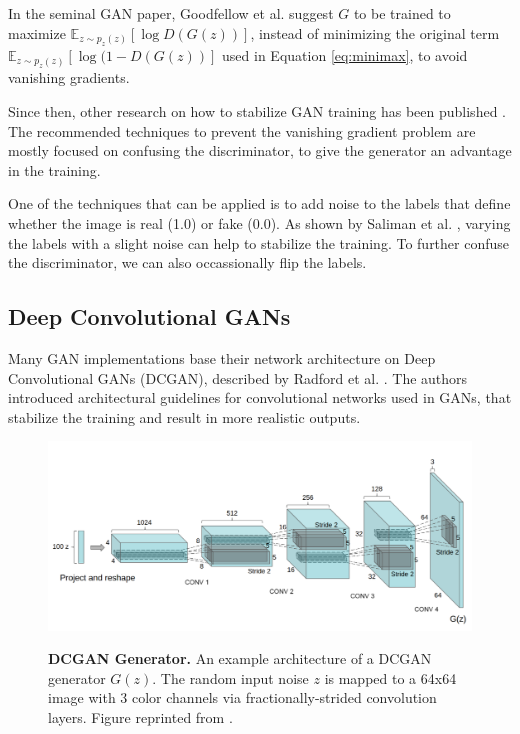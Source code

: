 \documentclass[12pt]{report}
\begin{document}
In the seminal GAN paper, Goodfellow et al. \cite{goodfellow_generative_2014} suggest $G$ to be trained to maximize $\mathbb{E}_{z \sim p_{z}(z)}[\log D(G(z))]$, instead of minimizing the original term $\mathbb{E}_{z \sim p_{z}(z)}[\log (1 - D(G(z))]$ used in Equation \ref{eq:minimax}, to avoid vanishing gradients. 

Since then, other research on how to stabilize GAN training has been published \cite{arjovsky_towards_2017}\cite{roth_stabilizing_2017}\cite{salimans_improved_2016}. The recommended techniques to prevent the vanishing gradient problem are mostly focused on confusing the discriminator, to give the generator an advantage in the training. 

One of the techniques that can be applied is to add noise to the labels that define whether the image is real (1.0) or fake (0.0). As shown by Saliman et al. \cite{salimans_improved_2016}, varying the labels with a slight noise can help to stabilize the training. To further confuse the discriminator, we can also occassionally flip the labels. 

\subsection{Deep Convolutional GANs} \label{sec:dcgan}


Many GAN implementations base their network architecture on Deep Convolutional GANs (DCGAN), described by Radford et al. \cite{radford_unsupervised_2015}. The authors introduced architectural guidelines for convolutional networks used in GANs, that stabilize the training and result in more realistic outputs.

\begin{figure}[t]
\centering
{\includegraphics[width=\linewidth]{02_background/dcgan_generator}}
\caption{\label{fig:dcgan} \textbf{DCGAN Generator.} An example architecture of a DCGAN generator $G(z)$. The random input noise $z$ is mapped to a 64x64 image with 3 color channels via fractionally-strided convolution layers. Figure reprinted from \cite{radford_unsupervised_2015}.}
\end{figure}
\end{document}
